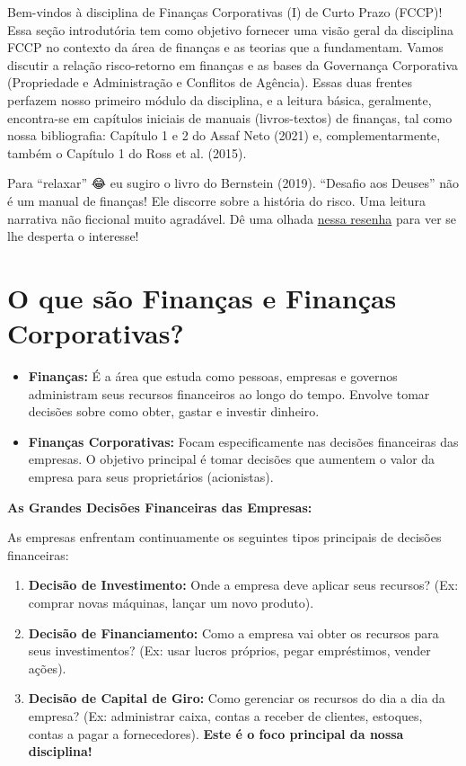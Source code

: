 \documentclass[
  a4paper,
]{book}
\begin{document}
Bem-vindos à disciplina de Finanças Corporativas (I) de Curto Prazo
(FCCP)! Essa seção introdutória tem como objetivo fornecer uma visão
geral da disciplina FCCP no contexto da área de finanças e as teorias
que a fundamentam. Vamos discutir a relação risco-retorno em finanças e
as bases da Governança Corporativa (Propriedade e Administração e
Conflitos de Agência). Essas duas frentes perfazem nosso primeiro módulo
da disciplina, e a leitura básica, geralmente, encontra-se em capítulos
iniciais de manuais (livros-textos) de finanças, tal como nossa
bibliografia: Capítulo 1 e 2 do Assaf Neto (2021) e, complementarmente,
também o Capítulo 1 do Ross et al. (2015).

Para ``relaxar'' 😂 eu sugiro o livro do Bernstein (2019). ``Desafio aos
Deuses'' não é um manual de finanças! Ele discorre sobre a história do
risco. Uma leitura narrativa não ficcional muito agradável. Dê uma
olhada
\href{https://medium.com/@fabiofigueiredo_44303/resenha-do-livro-desafio-aos-deuses-a-hist\%C3\%B3ria-do-risco-9607fab2aa30}{nessa
resenha} para ver se lhe desperta o interesse!

\section{O que são Finanças e Finanças
Corporativas?}\label{o-que-suxe3o-finanuxe7as-e-finanuxe7as-corporativas}

\begin{itemize}
\item
  \textbf{Finanças:} É a área que estuda como pessoas, empresas e
  governos administram seus recursos financeiros ao longo do tempo.
  Envolve tomar decisões sobre como obter, gastar e investir dinheiro.
\item
  \textbf{Finanças Corporativas:} Focam especificamente nas decisões
  financeiras das empresas. O objetivo principal é tomar decisões que
  aumentem o valor da empresa para seus proprietários (acionistas).
\end{itemize}

\textbf{As Grandes Decisões Financeiras das Empresas:}

As empresas enfrentam continuamente os seguintes tipos principais de
decisões financeiras:

\begin{enumerate}
\def\labelenumi{\arabic{enumi}.}
\item
  \textbf{Decisão de Investimento:} Onde a empresa deve aplicar seus
  recursos? (Ex: comprar novas máquinas, lançar um novo produto).
\item
  \textbf{Decisão de Financiamento:} Como a empresa vai obter os
  recursos para seus investimentos? (Ex: usar lucros próprios, pegar
  empréstimos, vender ações).
\item
  \textbf{Decisão de Capital de Giro:} Como gerenciar os recursos do dia
  a dia da empresa? (Ex: administrar caixa, contas a receber de
  clientes, estoques, contas a pagar a fornecedores). \textbf{Este é o
  foco principal da nossa disciplina!}
\end{enumerate}
\end{document}

